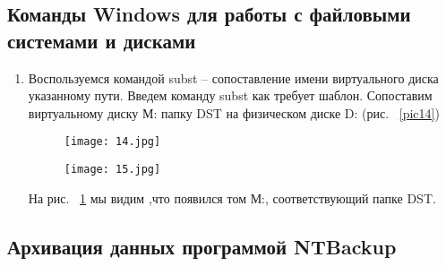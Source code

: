 \subsection{Команды Windows для работы с файловыми системами и дисками}
\begin{enumerate}
\item
Воспользуемся командой subst -- сопоставление имени виртуального диска указанному пути. Введем команду subst как требует шаблон. Сопоставим виртуальному диску М: папку DST на физическом диске D: (рис. ~\ref{pic14})

\begin{figure}[h!t] 
  \begin{center}

  \begin{minipage}[h]{0.4\linewidth}

  \texttt{[image: 14.jpg]}
  \caption{\label{pic14}}

  \end{minipage}
  \hfill   
  \begin{minipage}[h]{0.4\linewidth}
  
  \texttt{[image: 15.jpg]}
  \caption{\label{pic15}}

  \end{minipage}          
  \end{center}
\end{figure}


На рис. ~\ref{pic15} мы видим ,что появился том М:, соответствующий папке DST.

\end{enumerate}


\subsection{Архивация данных программой NTBackup}

